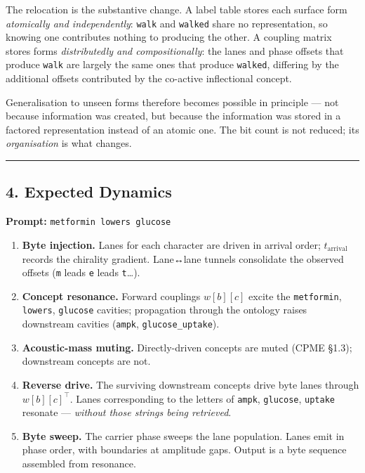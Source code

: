 \documentclass[
  11pt,
  a4paper,
]{article}
\providecommand{\tightlist}{%
  \setlength{\itemsep}{0pt}\setlength{\parskip}{0pt}}
\begin{document}
The relocation is the substantive change. A label table stores each
surface form \emph{atomically and independently}: \texttt{walk} and
\texttt{walked} share no representation, so knowing one contributes
nothing to producing the other. A coupling matrix stores forms
\emph{distributedly and compositionally}: the lanes and phase offsets
that produce \texttt{walk} are largely the same ones that produce
\texttt{walked}, differing by the additional offsets contributed by the
co-active inflectional concept.

Generalisation to unseen forms therefore becomes possible in principle
--- not because information was created, but because the information was
stored in a factored representation instead of an atomic one. The bit
count is not reduced; its \emph{organisation} is what changes.

\begin{center}\rule{0.5\linewidth}{0.5pt}\end{center}

\subsection{4. Expected Dynamics}\label{expected-dynamics}

\textbf{Prompt:} \texttt{metformin\ lowers\ glucose}

\begin{enumerate}
\def\labelenumi{\arabic{enumi}.}
\tightlist
\item
  \textbf{Byte injection.} Lanes for each character are driven in
  arrival order; \(t_{\text{arrival}}\) records the chirality gradient.
  Lane↔lane tunnels consolidate the observed offsets (\texttt{m} leads
  \texttt{e} leads \texttt{t}\ldots).
\item
  \textbf{Concept resonance.} Forward couplings \(w[b][c]\) excite the
  \texttt{metformin}, \texttt{lowers}, \texttt{glucose} cavities;
  propagation through the ontology raises downstream cavities
  (\texttt{ampk}, \texttt{glucose\_uptake}).
\item
  \textbf{Acoustic-mass muting.} Directly-driven concepts are muted
  (CPME §1.3); downstream concepts are not.
\item
  \textbf{Reverse drive.} The surviving downstream concepts drive byte
  lanes through \(w[b][c]^{\!\top}\). Lanes corresponding to the letters
  of \texttt{ampk}, \texttt{glucose}, \texttt{uptake} resonate ---
  \emph{without those strings being retrieved}.
\item
  \textbf{Byte sweep.} The carrier phase sweeps the lane population.
  Lanes emit in phase order, with boundaries at amplitude gaps. Output
  is a byte sequence assembled from resonance.
\end{enumerate}
\end{document}
